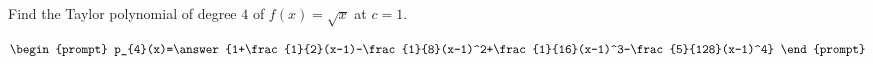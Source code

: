 \documentclass{ximera}
\author{Gregory Hartman \and Matthew Carr}
\begin{document}
\begin{exercise}




Find the Taylor polynomial of degree $4$ of $f(x)=\sqrt{x}$ at $c=1$.

\[
\begin{prompt}
p_{4}(x)=\answer{1+\frac{1}{2}(x-1)-\frac{1}{8}(x-1)^2+\frac{1}{16}(x-1)^3-\frac{5}{128}(x-1)^4}
\end{prompt}
\]

\end{exercise}
\end{document}
